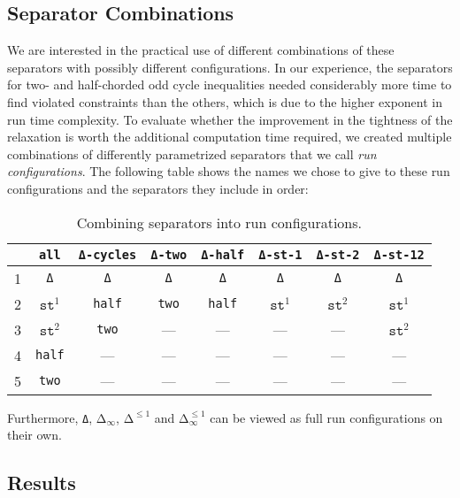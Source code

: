 \subsection{Separator Combinations}\label{subsec:separator_combinations}
We are interested in the practical use of different combinations of these separators with possibly different configurations.
In our experience, the separators for two- and half-chorded odd cycle inequalities needed considerably more time to find violated constraints than the others, which is due to the higher exponent in run time complexity.
To evaluate whether the improvement in the tightness of the relaxation is worth the additional computation time required, we created multiple combinations of differently parametrized separators that we call \textit{run configurations}.
The following table shows the names we chose to give to these run configurations and the separators they include in order:
\begin{table}[H]
	\centering
	\begin{tabular}{|l||c|c|c|c|c|c|c||}
		\hline
			& \texttt{all} 	& \texttt{Δ-cycles} & \texttt{Δ-two} & \texttt{Δ-half}	& \texttt{Δ-st-1} & \texttt{Δ-st-2} & \texttt{Δ-st-12} \\[0.5ex]
		\hline\hline
		1 	& \texttt{Δ} 	& \texttt{Δ} 				& \texttt{Δ} 	& \texttt{Δ} 		& \texttt{Δ} 	& \texttt{Δ} 	& \texttt{Δ} 	\\ 
		2 	& $\texttt{st}^{1}$ & \texttt{half} & \texttt{two} 			& \texttt{half} 				& $\texttt{st}^{1}$ 			& $\texttt{st}^{2}$  		& $\texttt{st}^{1}$			\\
		3 	& $\texttt{st}^{2}$			& \texttt{two} 						&--- &--- &---  			&--- & $\texttt{st}^{2}$			\\
		4 	& \texttt{half} &--- &---&---&---&---&---  \\
		5 	& \texttt{two}	&--- &---&---&---&---&---	\\
		\hline
	\end{tabular}
	\caption{Combining separators into run configurations.}
\end{table}
Furthermore, \texttt{Δ}, $\texttt{Δ}_{\infty}$, $\texttt{Δ}^{\leq 1}$ and $\texttt{Δ}_{\infty}^{\leq 1}$ can be viewed as full run configurations on their own.

\subsection{Results}\label{subsec:experiments_results}
